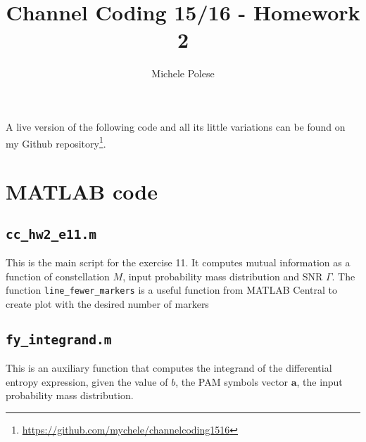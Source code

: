 \documentclass[10pt]{article}
\numberwithin{equation}{section}
\begin{document}
\title{Channel Coding 15/16 - Homework 2}
\author{Michele Polese}

\maketitle

A live version of the following code and all its little variations can be found on my Github repository\footnote{\url{https://github.com/mychele/channelcoding1516}}.

\section*{MATLAB code}

\subsection*{\texttt{cc\_hw2\_e11.m}}
This is the main script for the exercise 11. It computes mutual information as a function of constellation $M$, input probability mass distribution and SNR $\Gamma$. The function \texttt{line\_fewer\_markers} is a useful function from MATLAB Central to create plot with the desired number of markers


\subsection*{\texttt{fy\_integrand.m}} 
This is an auxiliary function that computes the integrand of the differential entropy expression, given the value of $b$, the PAM symbols vector $\mathbf{a}$, the input probability mass distribution.

\end{document}
